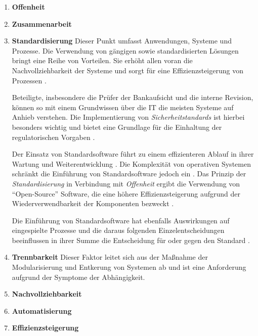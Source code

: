 \begin{enumerate}
    \item \textbf{Offenheit \cite{Brockhoff2006}}
    
    \item \textbf{Zusammenarbeit}

    \item \textbf{Standardisierung} 
    Dieser Punkt umfasst Anwendungen, Systeme und Prozesse. Die Verwendung von gängigen sowie standardisierten Lösungen bringt eine Reihe von Vorteilen. Sie erhöht allen voran die Nachvollziehbarkeit der Systeme und sorgt für eine Effizienzsteigerung von Prozessen \cite{Strietzel2018, Bussmann2006, Alt2017}. 
    
    Beteiligte, insbesondere die Prüfer der Bankaufsicht und die interne Revision, können so mit einem Grundwissen über die IT die meisten Systeme auf Anhieb verstehen. Die Implementierung von \emph{Sicherheitstandards \cite{IT-Grundschutz:2020, Disterer2013}} ist hierbei besonders wichtig und bietet eine Grundlage für die Einhaltung der regulatorischen Vorgaben \cite{MaRisk:2017, BAIT:2018}.
    
    Der Einsatz von Standardsoftware führt zu einem effizienteren Ablauf in ihrer Wartung und Weiterentwicklung \cite{Bussmann2006}. Die Komplexität von operativen Systemen schränkt die Einführung von Standardsoftware jedoch ein \cite[S.27]{Bussmann2006}. Das Prinzip der \emph{Standardisierung} in Verbindung mit \emph{Offenheit} ergibt die Verwendung von \enquote{Open-Source} Software, die eine höhere Effizienzsteigerung aufgrund der Wiederverwendbarkeit der Komponenten bezweckt \cite{Brockhoff2006, Gupta:2017}. 
    
    Die Einführung von Standardsoftware hat ebenfalls Auswirkungen auf eingespielte Prozesse und die daraus folgenden Einzelentscheidungen beeinflussen in ihrer Summe die Entscheidung für oder gegen den Standard \cite[Tab.1]{Manz2018}.
    
    \item \textbf{Trennbarkeit}
    Dieser Faktor leitet sich aus der Maßnahme der Modularisierung und Entkerung von Systemen \citet{Bussmann2006} ab und ist eine Anforderung aufgrund der Symptome der Abhängigkeit.
    
    \item \textbf{Nachvollziehbarkeit}
    
    
    \item \textbf{Automatisierung}
    
    \item \textbf{Effizienzsteigerung}
    

\end{enumerate}

